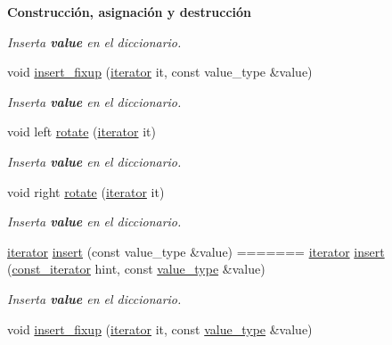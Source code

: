 \begin{Indent}{\bf \-Construcción, asignación y destrucción}
\begin{Indent}
\begin{DoxyCompactItemize}
\begin{DoxyCompactList}\small\item\em \-Inserta {\bfseries value} en el diccionario. \end{DoxyCompactList}\item 
void \hyperlink{classaed2_1_1iterator_ab23378eb6149357e1a2167e9804eb6e3_ab23378eb6149357e1a2167e9804eb6e3}{insert\-\_\-fixup} (\hyperlink{classaed2_1_1iterator_1_1iterator}{iterator} it, const value\-\_\-type \&value)
\begin{DoxyCompactList}\small\item\em \-Inserta {\bfseries value} en el diccionario. \end{DoxyCompactList}\item 
void left \hyperlink{classaed2_1_1iterator_af4e447a081108196ecdf39b16ecb5303_af4e447a081108196ecdf39b16ecb5303}{rotate} (\hyperlink{classaed2_1_1iterator_1_1iterator}{iterator} it)
\begin{DoxyCompactList}\small\item\em \-Inserta {\bfseries value} en el diccionario. \end{DoxyCompactList}\item 
void right \hyperlink{classaed2_1_1iterator_a191eae4f3f076914ff1560a2fa833b70_a191eae4f3f076914ff1560a2fa833b70}{rotate} (\hyperlink{classaed2_1_1iterator_1_1iterator}{iterator} it)
\begin{DoxyCompactList}\small\item\em \-Inserta {\bfseries value} en el diccionario. \end{DoxyCompactList}\item 
\hyperlink{classaed2_1_1iterator_1_1iterator}{iterator} \hyperlink{classaed2_1_1iterator_aa1870e8bfa4f45c82fa1ee076846922b_aa1870e8bfa4f45c82fa1ee076846922b}{insert} (const value\-\_\-type \&value)
=======
\hyperlink{classaed2_1_1iterator_1_1iterator}{iterator} \hyperlink{classaed2_1_1iterator_ab9446668ad5619115b6c4a10eac83d68_ab9446668ad5619115b6c4a10eac83d68}{insert} (\hyperlink{classaed2_1_1iterator_1_1const__iterator}{const\+\_\+iterator} hint, const \hyperlink{classaed2_1_1iterator_a6411a2c08b2b7c52f063bef1a168acb6_a6411a2c08b2b7c52f063bef1a168acb6}{value\+\_\+type} \&value)
\begin{DoxyCompactList}\small\item\em Inserta {\bfseries value} en el diccionario. \end{DoxyCompactList}\item 
void \hyperlink{classaed2_1_1iterator_ab23378eb6149357e1a2167e9804eb6e3_ab23378eb6149357e1a2167e9804eb6e3}{insert\+\_\+fixup} (\hyperlink{classaed2_1_1iterator_1_1iterator}{iterator} it, const \hyperlink{classaed2_1_1iterator_a6411a2c08b2b7c52f063bef1a168acb6_a6411a2c08b2b7c52f063bef1a168acb6}{value\+\_\+type} \&value)

\end{DoxyCompactItemize}
\end{Indent}
\end{Indent}
